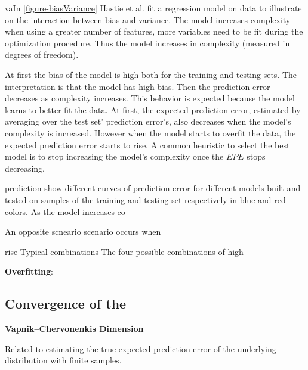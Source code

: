 vaIn \ref{figure-biasVariance} Hastie et al. fit a regression model on data to illustrate on the interaction between bias and variance. The model increases complexity when using a greater number of features, more variables need to be fit during the optimization procedure. Thus the model increases in complexity (measured in degrees of freedom). 

At first the bias of the model is high both for the training and testing sets. The interpretation is that the model has high bias. Then the prediction error decreases as complexity increases. This behavior is expected because the model learns to better fit the data. At first, the expected prediction error, estimated by averaging over the test set' prediction error's, also decreases when the model's complexity is increased. However when the model starts to overfit the data, the expected prediction error starts to rise. A common heuristic to select the best model is to stop increasing the model's complexity once the $EPE$ stops decreasing.


prediction 
show different curves of prediction error for different models built and tested on samples of the training and testing set respectively in blue and red colors. As the model increases co

An opposite scneario scenario occurs when

rise Typical combinations
The four possible combinations of high 


\textbf{Overfitting}: 
 




\subsection{Convergence of the }
\textbf{Vapnik–Chervonenkis Dimension}
\cite{vapnik-nature2013}
\cite{cherkassky-learning2007}

Related to estimating the true expected prediction error of the underlying distribution with finite samples.

